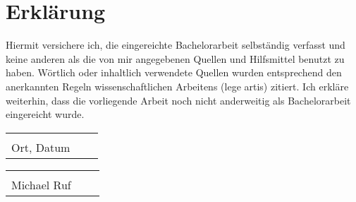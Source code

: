 \chapter*{Erklärung}
\vspace{2.5cm}
Hiermit versichere ich, die eingereichte Bachelorarbeit selbständig verfasst und 
keine anderen als die von mir angegebenen Quellen und Hilfsmittel benutzt zu haben. 
Wörtlich oder inhaltlich verwendete Quellen wurden entsprechend den anerkannten Regeln 
wissenschaftlichen Arbeitens (lege artis) zitiert. Ich erkläre weiterhin, dass die 
vorliegende Arbeit noch nicht anderweitig als Bachelorarbeit eingereicht wurde. 
\\[3.5cm]
\begin{tabular}{p{7cm}p{.5cm}l}
\dotfill \\ 
Ort, Datum
\end{tabular}
\vspace{1,5 cm} 
\begin{tabular}{p{7cm}p{.5cm}l}
\dotfill \\ 
Michael Ruf 
\end{tabular}